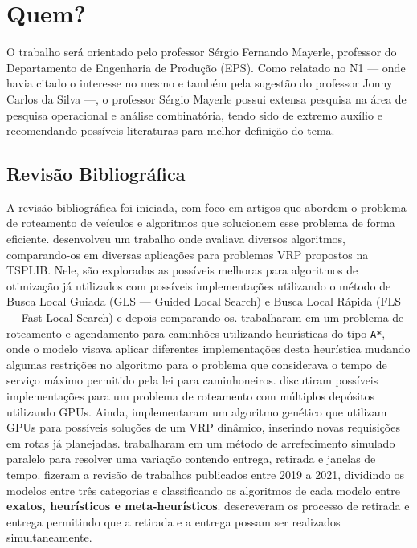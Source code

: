\documentclass[
    openany,
    12pt,
    a4paper,
    twoside,
    english,
    brazil, sumario=tradicional
]{/home/lucas_galdino/Desktop/TCC/planning/abntex2/abntex2}
\let\oldchapter\chapter
\renewcommand{\chapter}{\clearpage\oldchapter}
\begin{document}
\chapter{Quem?}

O trabalho será orientado pelo professor Sérgio Fernando Mayerle, professor do Departamento de Engenharia de Produção (EPS). Como relatado no N1 — onde havia citado o interesse no mesmo e também pela sugestão do professor Jonny Carlos da Silva —, o professor Sérgio Mayerle possui extensa pesquisa na área de pesquisa operacional e análise combinatória, tendo sido de extremo auxílio e recomendando possíveis literaturas para melhor definição do tema.

\section{Revisão Bibliográfica}

A revisão bibliográfica foi iniciada, com foco em artigos que abordem o problema de roteamento de veículos e algoritmos que solucionem esse problema de forma eficiente\@.  desenvolveu um trabalho onde avaliava diversos algoritmos, comparando-os em diversas aplicações para problemas VRP propostos na TSPLIB\@. Nele, são exploradas as possíveis melhoras para algoritmos de otimização já utilizados com possíveis implementações utilizando o método de Busca Local Guiada (GLS — Guided Local Search) e Busca Local Rápida (FLS — Fast Local Search) e depois comparando-os\@.  trabalharam em um problema de roteamento e agendamento para caminhões utilizando heurísticas do tipo \verb|A*|, onde o modelo visava aplicar diferentes implementações desta heurística mudando algumas restrições no algoritmo para o problema que considerava o tempo de serviço máximo permitido pela lei para caminhoneiros\@.  discutiram possíveis implementações para um problema de roteamento com múltiplos depósitos utilizando GPUs\@. Ainda,  implementaram um algoritmo genético que utilizam GPUs para possíveis soluções de um VRP dinâmico, inserindo novas requisições em rotas já planejadas\@.  trabalharam em um método de arrefecimento simulado paralelo para resolver uma variação contendo entrega, retirada e janelas de tempo\@.  fizeram a revisão de trabalhos publicados entre 2019 a 2021, dividindo os modelos entre três categorias e classificando os algoritmos de cada modelo entre \textbf{exatos, heurísticos e meta-heurísticos}\@.  descreveram os processo de retirada e entrega permitindo que a retirada e a entrega possam ser realizados simultaneamente.
\end{document}
